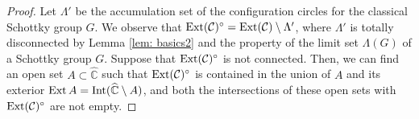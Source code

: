 \documentclass[12pt]{amsart}
\theoremstyle{plain}
\DeclareMathOperator{\Int}{\rm Int}
\DeclareMathOperator{\Ext}{\rm Ext}
\begin{document}
\begin{proof}
 
% 
 Let $\Lambda'$ be the accumulation set of the configuration circles for the classical Schottky group $G$.
 We observe that $\Ext (\mathcal{C})^{\circ}=\Ext (\mathcal{C}) \setminus \Lambda'$, 
 where $\Lambda'$ is
 totally disconnected by Lemma \ref{lem: basics2} and the property of the limit set $\Lambda(G)$
 of a Schottky group $G$. Suppose that $\Ext (\mathcal{C})^{\circ}$ is not connected.
 Then, we can find an open set $A \subset \widehat{\mathbb C}$ such that $\Ext (\mathcal{C})^{\circ}$ is contained 
in the union of
$A$ and its exterior $\Ext A=\Int(\widehat{\mathbb C} \setminus A)$, and 
both the intersections of these open sets with
$\Ext (\mathcal{C})^{\circ}$ are not empty. 

\end{proof}
\end{document}
